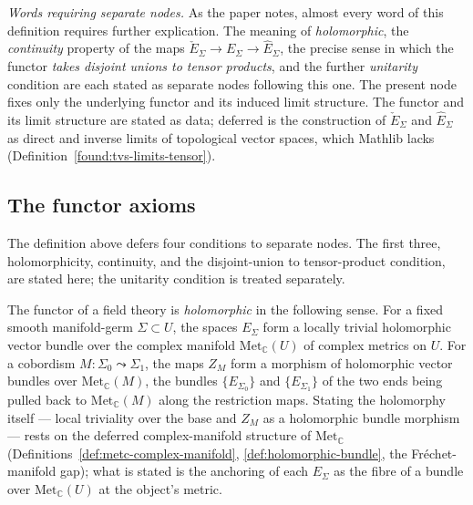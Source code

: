 \begin{definition}
  \emph{Words requiring separate nodes.} As the paper notes, almost every word
  of this definition requires further explication. The meaning of
  \emph{holomorphic}, the \emph{continuity} property of the maps
  $\check E_{\Sigma} \to E_{\Sigma} \to \hat E_{\Sigma}$, the precise sense in
  which the functor \emph{takes disjoint unions to tensor products}, and the
  further \emph{unitarity} condition are each stated as separate nodes following
  this one. The present node fixes only the underlying functor and its induced
  limit structure. The functor and its limit structure are stated as data;
  deferred is the construction of $\check E_\Sigma$ and $\hat E_\Sigma$ as
  direct and inverse limits of topological vector spaces, which Mathlib lacks
  (Definition~\ref{found:tvs-limits-tensor}).
\end{definition}

\subsection{The functor axioms}

The definition above defers four conditions to separate nodes. The first three,
holomorphicity, continuity, and the disjoint-union to tensor-product condition,
are stated here; the unitarity condition is treated separately.

\begin{definition}
  \label{def:holomorphicity}
  \notready
  The functor of a field theory is \emph{holomorphic} in the following sense.
  For a fixed smooth manifold-germ $\Sigma \subset U$, the spaces $E_{\Sigma}$
  form a locally trivial holomorphic vector bundle over the complex manifold
  $\mathrm{Met}_{\mathbb C}(U)$ of complex metrics on $U$. For a cobordism
  $M \colon \Sigma_0 \leadsto \Sigma_1$, the maps $Z_M$ form a morphism of
  holomorphic vector bundles over $\mathrm{Met}_{\mathbb C}(M)$, the bundles
  $\{E_{\Sigma_0}\}$ and $\{E_{\Sigma_1}\}$ of the two ends being pulled back to
  $\mathrm{Met}_{\mathbb C}(M)$ along the restriction maps. Stating the
  holomorphy itself --- local triviality over the base and $Z_M$ as a
  holomorphic bundle morphism --- rests on the deferred complex-manifold
  structure of $\mathrm{Met}_{\mathbb C}$
  (Definitions~\ref{def:metc-complex-manifold}, \ref{def:holomorphic-bundle},
  the Fr\'echet-manifold gap); what is stated is the anchoring of each
  $E_\Sigma$ as the fibre of a bundle over $\mathrm{Met}_{\mathbb C}(U)$ at the
  object's metric.
\end{definition}

